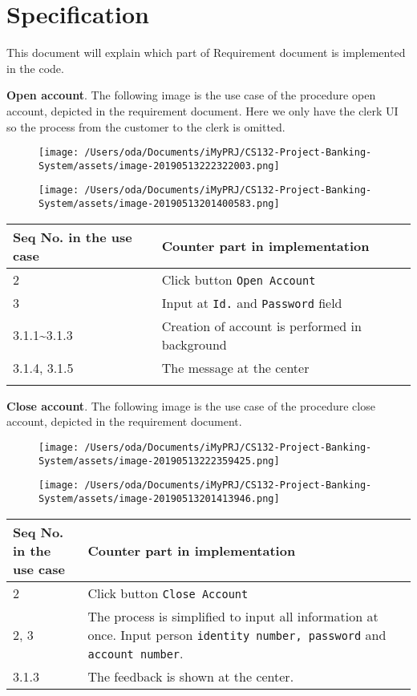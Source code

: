 \documentclass[]{article}
\date{}
\begin{document}
\section{Specification}\label{header-n90}

This document will explain which part of Requirement document is
implemented in the code.

\textbf{Open account}. The following image is the use case of the
procedure open account, depicted in the requirement document. Here we
only have the clerk UI so the process from the customer to the clerk is
omitted.

\begin{figure}
\centering
\texttt{[image: /Users/oda/Documents/iMyPRJ/CS132-Project-Banking-System/assets/image-20190513222322003.png]}
\caption{}
\end{figure}

\begin{figure}
\centering
\texttt{[image: /Users/oda/Documents/iMyPRJ/CS132-Project-Banking-System/assets/image-20190513201400583.png]}
\caption{}
\end{figure}

\begin{longtable}[]{@{}ll@{}}
\toprule
Seq No. in the use case & Counter part in implementation\tabularnewline
\midrule
\endhead
2 & Click button \texttt{Open\ Account}\tabularnewline
3 & Input at \texttt{Id.} and \texttt{Password} field\tabularnewline
3.1.1\textasciitilde{}3.1.3 & Creation of account is performed in
background\tabularnewline
3.1.4, 3.1.5 & The message at the center\tabularnewline
&\tabularnewline
\bottomrule
\end{longtable}

\textbf{Close account}. The following image is the use case of the
procedure close account, depicted in the requirement document.

\begin{figure}
\centering
\texttt{[image: /Users/oda/Documents/iMyPRJ/CS132-Project-Banking-System/assets/image-20190513222359425.png]}
\caption{}
\end{figure}

\begin{figure}
\centering
\texttt{[image: /Users/oda/Documents/iMyPRJ/CS132-Project-Banking-System/assets/image-20190513201413946.png]}
\caption{}
\end{figure}

\begin{longtable}[]{@{}ll@{}}
\toprule
Seq No. in the use case & Counter part in implementation\tabularnewline
\midrule
\endhead
2 & Click button \texttt{Close\ Account}\tabularnewline
2, 3 & The process is simplified to input all information at once. Input
person \texttt{identity\ number,\ password} and
\texttt{account\ number}.\tabularnewline
3.1.3 & The feedback is shown at the center.\tabularnewline
\bottomrule
\end{longtable}
\end{document}
